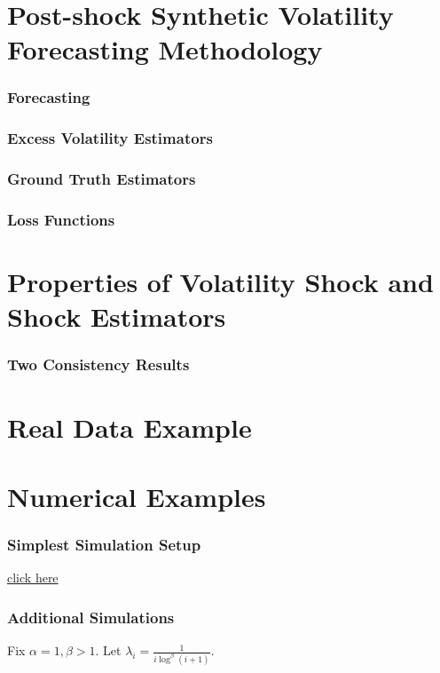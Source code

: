 \documentclass{beamer}
\theoremstyle{definition}
\begin{document}
\section{Post-shock Synthetic Volatility Forecasting Methodology}

\begin{frame}
\frametitle{Forecasting}
\end{frame}

\begin{frame}
\frametitle{Excess Volatility Estimators}
\end{frame}

\begin{frame}

\frametitle{Ground Truth Estimators}

\end{frame}

\begin{frame}

\frametitle{Loss Functions}
\end{frame}

\section{Properties of Volatility Shock and Shock Estimators}
\frametitle{Two Consistency Results}

\section{Real Data Example}

\section{Numerical Examples}

\begin{frame}
\fontsize{8pt}{9pt}

\frametitle{Simplest Simulation Setup}

\hyperlink{target}{click here}

\end{frame}

\begin{frame}
\frametitle{Additional Simulations}
\label{target}

\begin{example}
Fix $\alpha = 1, \beta > 1$.  Let $\lambda_{i} = \frac{1}{i \log^{\beta}(i+1)}$.

\end{example}

\end{frame}
\end{document}
